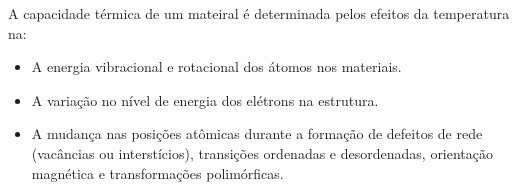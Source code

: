 A capacidade térmica de um mateiral é determinada pelos efeitos da temperatura na:

\begin{itemize}
  \item A energia vibracional e rotacional dos átomos nos materiais.
  \item A variação no nível de energia dos elétrons na estrutura.
  \item A mudança nas posições atômicas durante a formação de defeitos de rede (vacâncias ou interstícios), transições ordenadas e desordenadas, orientação magnética e transformações polimórficas.
\end{itemize}



